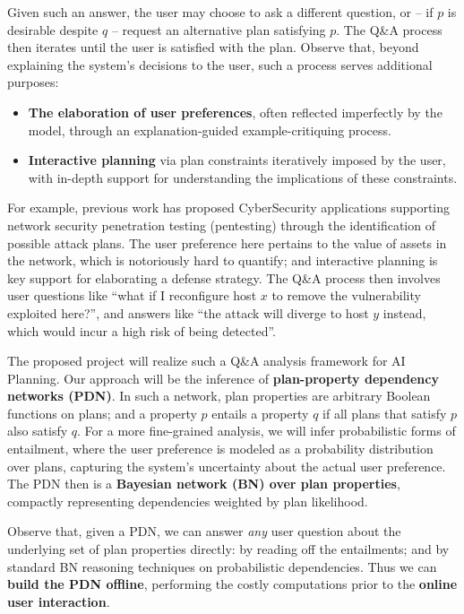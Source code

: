 Given such an answer, the user may choose to ask a different question,
or -- if $p$ is desirable despite $q$ -- request an alternative plan
satisfying $p$. The Q\&A process then iterates until the user is
satisfied with the plan. Observe that, beyond explaining the system's
decisions to the user, such a process serves additional purposes:
\begin{itemize}
\item \textbf{The elaboration of user preferences}, often reflected
  imperfectly by the model, through an explanation-guided
  example-critiquing process.
\item \textbf{Interactive planning} via plan constraints iteratively
  imposed by the user, with in-depth support for understanding the
  implications of these constraints.
\end{itemize}
For example, previous work has proposed CyberSecurity applications
supporting network security penetration testing (pentesting) through
the identification of possible attack plans. The user preference here
pertains to the value of assets in the network, which is notoriously
hard to quantify; and interactive planning is key support for
elaborating a defense strategy. The Q\&A process then involves user
questions like ``what if I reconfigure host $x$ to remove the
vulnerability exploited here?'', and answers like ``the attack will
diverge to host $y$ instead, which would incur a high risk of being
detected''.

The proposed project will realize such a Q\&A analysis framework for
AI Planning. Our approach will be the inference of
\textbf{plan-property dependency networks (PDN)}. In such a network,
plan properties are arbitrary Boolean functions on plans;
and a property $p$ entails a property $q$ if all plans that satisfy
$p$ also satisfy $q$. For a more fine-grained analysis, we will infer
probabilistic forms of entailment, where the user preference is
modeled as a probability distribution over plans, capturing the
system's uncertainty about the actual user preference. The PDN then is
a \textbf{Bayesian network (BN) over plan properties}, compactly
representing dependencies weighted by plan likelihood.

Observe that, given a PDN, we can answer \emph{any} user question
about the underlying set of plan properties directly: by reading off
the entailments; and by standard BN reasoning techniques on
probabilistic dependencies. Thus we can \textbf{build the PDN
  offline}, performing the costly computations prior to the
\textbf{online user interaction}.

